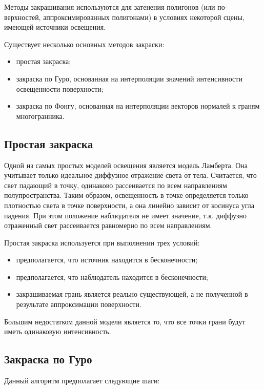 Методы закрашивания используются для затенения полигонов (или по-
верхностей, аппроксимированных полигонами) в условиях некоторой сцены, имеющей источники освещения.

Существует несколько основных методов закраски:
\begin{itemize}
	\item простая закраска;
	\item закраска по Гуро, основанная на интерполяции значений интенсивности освещенности поверхности;
	\item закраска по Фонгу, основанная на интерполяции векторов нормалей к граням многогранника.
\end{itemize}

\subsection{Простая закраска}

Одной из самых простых моделей освещения является модель Ламберта. Она учитывает только идеальное диффузное отражение света от тела. Считается, что свет падающий в точку, одинаково рассеивается по всем направлениям полупространства. Таким образом, освещенность в точке определяется только плотностью света в точке поверхности, а она линейно зависит от косинуса угла падения. При этом положение наблюдателя не имеет значение, т.к. диффузно отраженный свет рассеивается равномерно по всем направлениям.

Простая закраска используется при выполнении трех условий:
 \begin{itemize}
 	\item предполагается, что источник находится в бесконечности;
 	\item предполагается, что наблюдатель находится в бесконечности;
 	\item закрашиваемая грань является реально существующей, а не полученной в результате аппроксимации поверхности.
 \end{itemize}

Большим недостатком данной модели является то, что все точки грани будут иметь одинаковую интенсивность.


\subsection{Закраска по Гуро}

Данный алгоритм предполагает следующие шаги:

